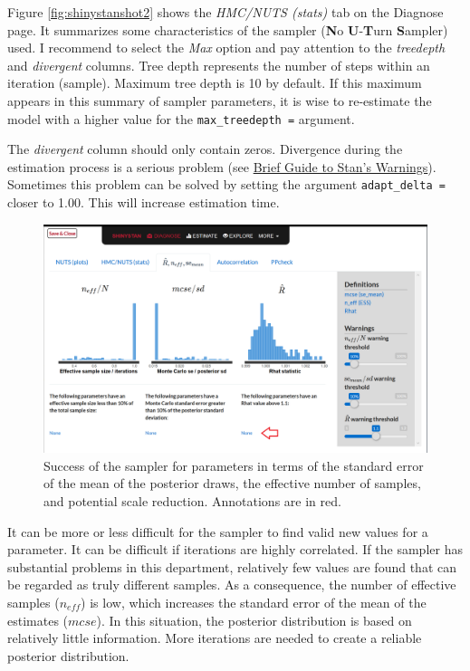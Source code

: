 \documentclass[doc]{apa6}
\begin{document}
Figure \ref{fig:shinystanshot2} shows the \emph{HMC/NUTS (stats)} tab on
the Diagnose page. It summarizes some characteristics of the sampler
(\textbf{N}o \textbf{U}-\textbf{T}urn \textbf{S}ampler) used. I
recommend to select the \emph{Max} option and pay attention to the
\emph{treedepth} and \emph{divergent} columns. Tree depth represents the
number of steps within an iteration (sample). Maximum tree depth is 10
by default. If this maximum appears in this summary of sampler
parameters, it is wise to re-estimate the model with a higher value for
the \texttt{max\_treedepth\ =} argument.

The \emph{divergent} column should only contain zeros. Divergence during
the estimation process is a serious problem (see
\href{https://mc-stan.org/misc/warnings.html\#divergent-transitions-after-warmup}{Brief
Guide to Stan's Warnings}). Sometimes this problem can be solved by
setting the argument \texttt{adapt\_delta\ =} closer to 1.00. This will
increase estimation time.

\begin{figure}[H]
\includegraphics[width=1\linewidth]{shinystan3} \caption{Success of the sampler for parameters in terms of the standard error of the mean of the posterior draws, the effective number of samples, and potential scale reduction. Annotations are in red.}\label{fig:shinystanshot3}
\end{figure}

It can be more or less difficult for the sampler to find valid new
values for a parameter. It can be difficult if iterations are highly
correlated. If the sampler has substantial problems in this department,
relatively few values are found that can be regarded as truly different
samples. As a consequence, the number of effective samples (\(n_{eff}\))
is low, which increases the standard error of the mean of the estimates
(\(mcse\)). In this situation, the posterior distribution is based on
relatively little information. More iterations are needed to create a
reliable posterior distribution.
\end{document}
